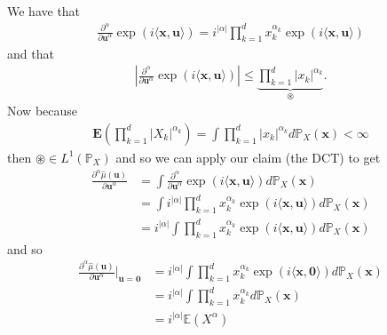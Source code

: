 \documentclass{unswmaths}
\begin{document}
We have that 
\begin{align}
	\frac{\partial^\alpha}{\partial \mathbf{u}^\alpha} \exp(i \langle \mathbf{x}, \mathbf{u} \rangle ) = i^{|\alpha|}\prod_{k=1}^d x_k^{\alpha_k}  \exp(i \langle \mathbf{x}, \mathbf{u} \rangle )
\end{align}
and that
\begin{align}
	\left| \frac{\partial^\alpha}{\partial \mathbf{u}^\alpha} \exp(i \langle \mathbf{x}, \mathbf{u} \rangle ) \right| \leq  \underbrace{\prod_{k=1}^d \left| x_k \right|
^{\alpha_k}}_{\circledast}.
\end{align}
Now because 
\begin{align}
	\mathbf{E}\left( \prod_{k=1}^d |X_k|^{\alpha_k}\right) = \int \prod_{k=1}^d \left| x_k \right|
^{\alpha_k} d\mathbb{P}_{X}(\mathbf{x}) < \infty 
\end{align}
then $ \circledast \in L^1(\mathbb{P}_X) $
and so we can apply our claim (the DCT) to get
\begin{align}
	\frac{\partial^\alpha \hat{\mu}(\mathbf{u})}{\partial \mathbf{u}^\alpha} &=  \int \frac{\partial^\alpha}{\partial \mathbf{u}^\alpha} \exp(i \langle \mathbf{x}, \mathbf{u} \rangle ) d\mathbb{P}_{X}(\mathbf{x}) \\
	&= \int i^{|\alpha|} \prod_{k=1}^d x_k^{\alpha_k} \exp(i \langle \mathbf{x}, \mathbf{u} \rangle ) d\mathbb{P}_{X}(\mathbf{x}) \\
	&= i^{|\alpha|} \int  \prod_{k=1}^d x_k^{\alpha_k} \exp(i \langle \mathbf{x}, \mathbf{u} \rangle ) d\mathbb{P}_{X}(\mathbf{x})
\end{align}
and so
\begin{align}
	\frac{\partial^\alpha \hat{\mu}(\mathbf{u})}{\partial \mathbf{u}^\alpha} \Big|_{\mathbf{u} = \mathbf{0}} &= i^{|\alpha|} \int  \prod_{k=1}^d x_k^{\alpha_k} \exp(i \langle \mathbf{x}, \mathbf{0} \rangle ) d\mathbb{P}_{X}(\mathbf{x}) \\
	&= i^{|\alpha|} \int  \prod_{k=1}^d x_k^{\alpha_k} d\mathbb{P}_{X}(\mathbf{x}) \\
	&= i^{|\alpha|} \mathbb{E}(X^\alpha)
\end{align}
\end{document}
